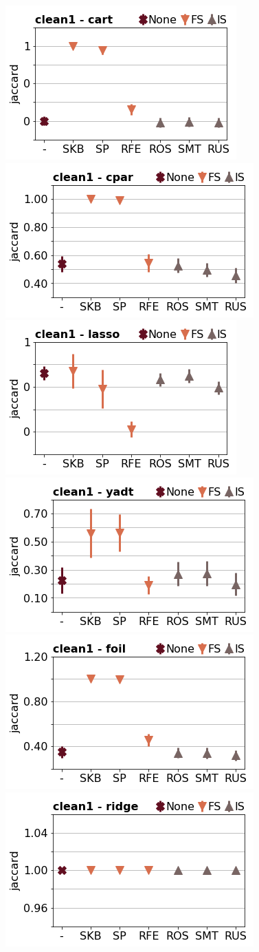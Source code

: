 \documentclass[runningheads,a4paper]{llncs}
\begin{document}
\begin{figure}[!h]
\includegraphics[width=0.32\linewidth]{fig/preps_clean1_DT_sklearn_jaccard.png}
\includegraphics[width=0.32\linewidth]{fig/preps_clean1_RB_cpar_jaccard.png}
\includegraphics[width=0.32\linewidth]{fig/preps_clean1_LM_lasso_jaccard.png}
\includegraphics[width=0.32\linewidth]{fig/preps_clean1_DT_yadt_jaccard.png}
\includegraphics[width=0.32\linewidth]{fig/preps_clean1_RB_foil_jaccard.png}
\includegraphics[width=0.32\linewidth]{fig/preps_clean1_LM_ridge_jaccard.png}
\end{figure}
\end{document}
